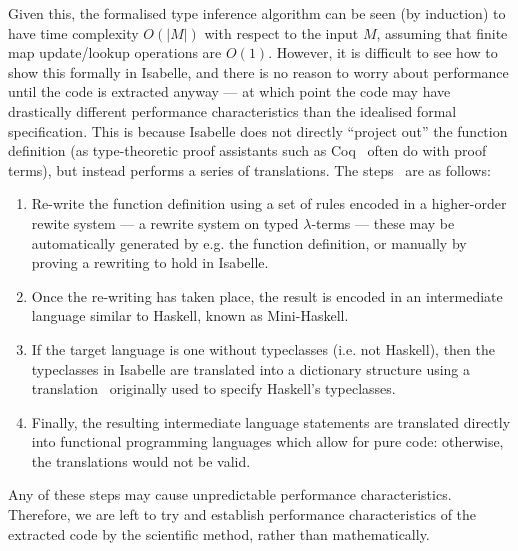 Given this, the formalised type inference algorithm can be seen (by induction) to have time complexity \(O(|M|)\) with respect to the input \(M\), assuming that finite map update/lookup operations are \(O(1)\).
However, it is difficult to see how to show this formally in Isabelle, and there is no reason to worry about performance until the code is extracted anyway --- at which point the code may have drastically different performance characteristics than the idealised formal specification.
This is because Isabelle does not directly ``project out'' the function definition (as type-theoretic proof assistants such as Coq~\cite{coq-extract} often do with proof terms), but instead performs a series of translations.
The steps~\cite{HRS} are as follows:
\begin{enumerate}
\item
Re-write the function definition using a set of rules encoded in a higher-order rewite system --- a rewrite system on typed \(\lambda\)-terms --- these may be automatically generated by e.g. the function definition, or manually by proving a rewriting to hold in Isabelle.
\item
Once the re-writing has taken place, the result is encoded in an intermediate language similar to Haskell, known as Mini-Haskell.
\item
If the target language is one without typeclasses (i.e. not Haskell), then the typeclasses in Isabelle are translated into a dictionary structure using a translation~\cite{dictionary-translation} originally used to specify Haskell's typeclasses.
\item
Finally, the resulting intermediate language statements are translated directly into functional programming languages which allow for pure code: otherwise, the translations would not be valid.
\end{enumerate}

Any of these steps may cause unpredictable performance characteristics.
Therefore, we are left to try and establish performance characteristics of the extracted code by the scientific method, rather than mathematically.

